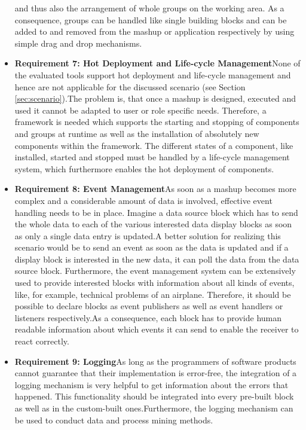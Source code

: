 \begin{itemize}
  and thus also the arrangement of whole groups on the working area. As a consequence, groups can be
  handled like single building blocks and can be added to and removed from the mashup or application
  respectively by using simple drag and drop mechanisms.
  \item \textbf{Requirement 7: Hot Deployment and Life-cycle Management}\newline None of the
  evaluated tools support hot deployment and life-cycle management and hence are not applicable for the
  discussed scenario (see Section \ref{sec:scenario}).\newline The problem is, that once a mashup is
  designed, executed and used it cannot be adapted to user or role specific needs. Therefore, a
  framework is needed which supports the starting and stopping of components and groups at runtime
  as well as the installation of absolutely new components within the framework. The different
  states of a component, like installed, started and stopped must be handled by a life-cycle
  management system, which furthermore enables the hot deployment of components.
  \item \textbf{Requirement 8: Event Management}\newline As soon as a mashup becomes more complex
  and a considerable amount of data is involved, effective event handling needs to be in place.
  Imagine a data source block which has to send the whole data to each of the various interested
  data display blocks as soon as only a single data entry is updated.\newline A better solution for
  realizing this scenario would be to send an event as soon as the data is updated and if a display
  block is interested in the new data, it can poll the data from the data source block.
  Furthermore, the event management system can be extensively used to provide interested blocks
  with information about all kinds of events, like, for example, technical problems of an airplane.
  Therefore, it should be possible to declare blocks as event publishers as well as event handlers
  or listeners respectively.\newline As a consequence, each block has to provide human readable
  information about which events it can send to enable the receiver to react correctly.
  \item \textbf{Requirement 9: Logging}\newline As long as the programmers of software
  products cannot guarantee that their implementation is error-free, the integration of a logging mechanism is
  very helpful to get information about the errors that happened. This functionality should be
  integrated into every pre-built block as well as in the custom-built ones.\newline Furthermore, the
  logging mechanism can be used to conduct data and process mining methods.
\end{itemize}